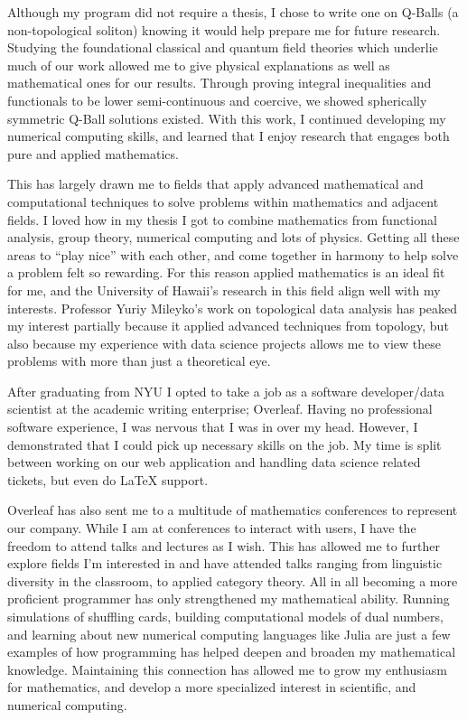 \documentclass[11pt]{article}
\begin{document}
Although my program did not require a thesis, I chose to write one on Q-Balls (a non-topological soliton) knowing it would help prepare me for future research. Studying the foundational classical and quantum field theories which underlie much of our work allowed me to give physical explanations as well as mathematical ones for our results. Through proving integral inequalities and functionals to be lower semi-continuous and coercive, we showed spherically symmetric Q-Ball solutions existed. With this work, I continued developing my numerical computing skills, and learned that I enjoy research that engages both pure and applied mathematics.

This has largely drawn me to fields that apply advanced mathematical and computational techniques to solve problems within mathematics and adjacent fields. I loved how in my thesis I got to combine mathematics from functional analysis, group theory, numerical computing and lots of physics. Getting all these areas to ``play nice'' with each other, and come together in harmony to help solve a problem felt so rewarding. For this reason applied mathematics is an ideal fit for me, and the University of Hawaii's research in this field align well with my interests. Professor Yuriy Mileyko's work on topological data analysis has peaked my interest partially because it applied advanced techniques from topology, but also because my experience with data science projects allows me to view these problems with more than just a theoretical eye.

After graduating from NYU I opted to take a job as a software developer/data scientist at the academic writing enterprise; Overleaf. Having no professional software experience, I was nervous that I was in over my head. However, I demonstrated that I could pick up necessary skills on the job. My time is split between working on our web application and handling data science related tickets, but even do \LaTeX{} support.

Overleaf has also sent me to a multitude of mathematics conferences to represent our company. While I am at conferences to interact with users, I have the freedom to attend talks and lectures as I wish. This has allowed me to further explore fields I'm interested in and have attended talks ranging from linguistic diversity in the classroom, to applied category theory. All in all becoming a more proficient programmer has only strengthened my mathematical ability. Running simulations of shuffling cards, building computational models of dual numbers, and learning about new numerical computing languages like Julia are just a few examples of how programming has helped deepen and broaden my mathematical knowledge. Maintaining this connection has allowed me to grow my enthusiasm for mathematics, and develop a more specialized interest in scientific, and numerical computing.
\end{document}
